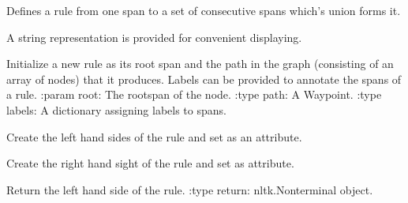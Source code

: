 \documentclass[letterpaper,10pt,english]{sphinxmanual}
\begin{document}

\begin{fulllineitems}
\label{alignments:alignments.Rule}
Defines a rule from one span to a set
of consecutive spans which's union
forms it.

A string representation is provided for convenient
displaying.

Initialize a new rule as its root span
and the path in the graph (consisting
of an array of nodes) that it produces.
Labels can be provided to annotate the spans
of a rule.
:param root:    The rootspan of the node.
:type path:             A Waypoint.
:type labels:   A dictionary assigning labels to spans.

\begin{fulllineitems}
\label{alignments:alignments.Rule._lhs}
Create the left hand sides of the rule
and set as an attribute.

\end{fulllineitems}


\begin{fulllineitems}
\label{alignments:alignments.Rule._rhs}
Create the right hand sight of the rule
and set as attribute.

\end{fulllineitems}


\begin{fulllineitems}
\label{alignments:alignments.Rule._str}
\end{fulllineitems}


\begin{fulllineitems}
\label{alignments:alignments.Rule.lhs}
Return the left hand side of the rule.
:type return:   nltk.Nonterminal object.

\end{fulllineitems}



\end{fulllineitems}
\end{document}
